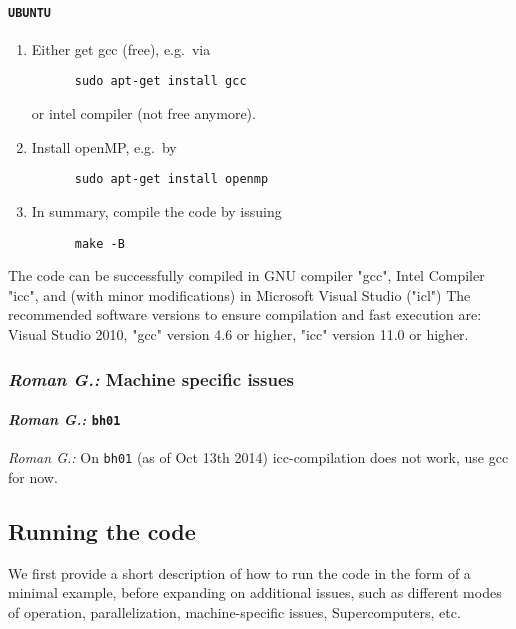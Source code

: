 \documentclass{emulateapj}
\newcommand{\rg}[1]{\color{blue}\textit{Roman G.:} #1\color{black}}
\begin{document}
\paragraph{{\tt UBUNTU}}

\begin{enumerate}

  \item Either get gcc (free), e.g.~via 
    \begin{verbatim}
      sudo apt-get install gcc
    \end{verbatim}
    or intel compiler (not free anymore).

  \item Install openMP, e.g.~by
    \begin{verbatim}
      sudo apt-get install openmp 
    \end{verbatim}

  \item In summary, compile the code by issuing
    \begin{verbatim}
      make -B
    \end{verbatim}

\end{enumerate}


The code can be successfully compiled in GNU compiler "gcc", Intel
Compiler "icc", and (with minor modifications) in Microsoft Visual
Studio ("icl") The recommended software versions to ensure compilation
and fast execution are: Visual Studio 2010, "gcc" version 4.6 or
higher, "icc" version 11.0 or higher.

\subsubsection{\rg{Machine specific issues}}
\paragraph{\rg{\tt bh01}}
\rg{On {\tt bh01} (as of Oct 13th 2014) icc-compilation does not work,
  use gcc for now.}


\subsection{{\bf Running} the code}
We first provide a short description of how to run the code in the
form of a minimal example, before expanding on additional issues, such
as different modes of operation, parallelization, machine-specific
issues, Supercomputers, etc.
\end{document}
